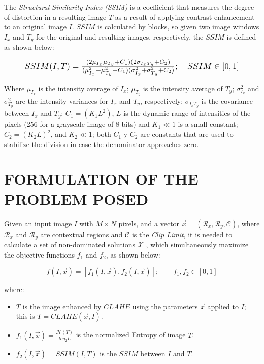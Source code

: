 \documentclass[spanish,twocolumn]{article}
\begin{document}
The {\it Structural Similarity Index (SSIM)} \cite{wang2004image} is a coefficient that measures the degree of distortion in a resulting image $T$ as a result of applying contrast enhancement to an original image $I$. $SSIM$ is calculated by blocks, so given two image windows $I_x$ and $T_y$ for the original and resulting images, respectively, the $SSIM$ is defined as shown below:

\begin{equation}\label{eq:ssim}
\resizebox{.9\hsize}{!}
{
$SSIM(I,T)=\frac{(2\mu_{I_x}\mu_{T_y}+C_1)(2\sigma_{I_xT_y}+C_2)}{(\mu_{I_x}^2+\mu_{T_y}^2+C_1)(\sigma_{I_x}^2+\sigma_{T_y}^2+C_2)}; \quad SSIM \in [0,1]$
}
\end{equation}

Where $\mu_{I_x}$ is the intensity average of $I_x$; $\mu_{T_y}$ is the intensity average of $T_y$; $\sigma_{I_x}^2$ and $\sigma_{T_y}^2$ are the intensity variances for $I_x$ and $T_y$, respectively; $\sigma_{I_x T_y}$ is the covariance between $I_x$ and $T_y$; $C_1=(K_1L^2)$, $L$ is the dynamic range of intensities of the pixels (256 for a grayscale image of 8 bits) and $K_1 \ll 1$ is a small constant; $C_2=(K_2 L)^2$, and $K_2 \ll 1$; both $C_1$ y $C_2$ are constants that are used to stabilize the division in case the denominator approaches zero.



\section{FORMULATION OF THE PROBLEM POSED}
\label{sec:formulacion}

Given an input image $I$ with $M \times N$ pixels, and a vector $\overrightarrow{x}=(\mathcal{R}_x, \mathcal{R}_y, \mathcal{C})$, where $\mathcal{R}_x$ and $\mathcal{R}_y$ are contextual regions and $\mathscr{C}$ is the {\it Clip Limit}, it is needed to calculate a set of non-dominated solutions $\mathscr{X}$ , which simultaneously maximize the objective functions $f_1$ and $f_2$, as shown below:

\begin{equation}\label{eq:fitness}
    f(I, \overrightarrow{x}) = [f_1(I, \overrightarrow{x}), f_2(I, \overrightarrow{x})]; \qquad f_1,f_2 \in [0,1]
\end{equation}

where:
\begin{itemize}
\item $T$ is the image enhanced by $CLAHE$ using the parameters $\overrightarrow{x}$ applied to $I$; this is $T=CLAHE(\overrightarrow{x},I)$.
\item $f_{1}(I, \overrightarrow{x})=\frac{\mathscr{H}(T)}{log_{2}L}$ is the normalized Entropy of image $T$.
\item $f_{2}(I, \overrightarrow{x})=SSIM(I,T)$ is the $SSIM$ between $I$ and $T$.
\end{itemize}
\end{document}
